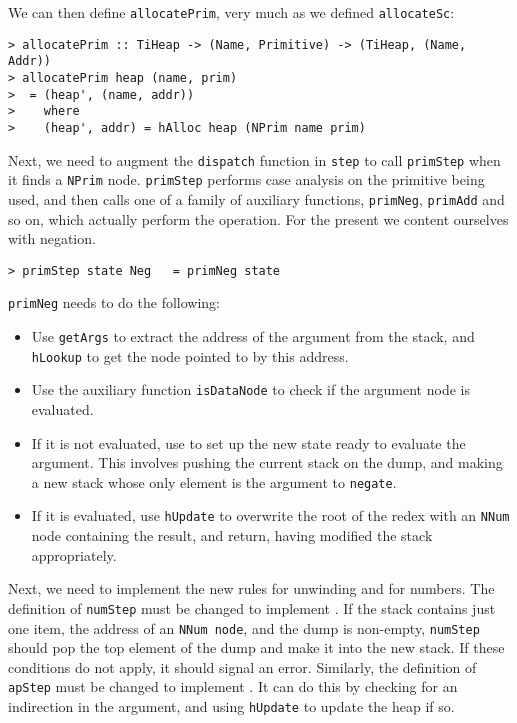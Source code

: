 We can then define \mbox{\tt allocatePrim}, very much as we defined \mbox{\tt allocateSc}:
\begin{verbatim}
> allocatePrim :: TiHeap -> (Name, Primitive) -> (TiHeap, (Name, Addr))
> allocatePrim heap (name, prim)
>  = (heap', (name, addr))
>    where
>    (heap', addr) = hAlloc heap (NPrim name prim)
\end{verbatim}
%
%
\par
Next, we need to augment the \mbox{\tt dispatch} function in \mbox{\tt step} to
call \mbox{\tt primStep} when it finds a \mbox{\tt NPrim} node.
\mbox{\tt primStep} performs case analysis on the primitive being used,
and then calls one of a family of
auxiliary functions, \mbox{\tt primNeg}, \mbox{\tt primAdd} and so on, which actually
perform the operation.  For the present we content ourselves with
negation.
\begin{verbatim}
> primStep state Neg   = primNeg state
\end{verbatim}
%
\mbox{\tt primNeg} needs to do the following:
\begin{itemize}
\item
Use \mbox{\tt getArgs} to extract
the address of the argument from the stack, and \mbox{\tt hLookup} to get the node
pointed to by this address.
\item
Use the auxiliary function \mbox{\tt isDataNode} to
check if the argument node is evaluated.

\item
If it is not evaluated, use  to set up the new
state ready to evaluate the argument.
This involves pushing the current stack on the dump, and making a new stack
whose only element is the argument to \mbox{\tt negate}.

\item
If it is evaluated, use \mbox{\tt hUpdate} to overwrite
the root of the redex with an \mbox{\tt NNum} node
containing the result, and return, having modified the stack appropriately.
\end{itemize}

Next, we need to implement the new rules for unwinding and
for numbers.
The definition of \mbox{\tt numStep} must be changed
to implement .
If the stack contains
just one item, the address of an \mbox{\tt NNum\ node}, and the dump is non-empty,
\mbox{\tt numStep} should pop the top element of the dump and make it into the new stack.
If these conditions do not apply, it should signal an error.
Similarly, the definition of \mbox{\tt apStep} must be changed to implement
.
It can do this by checking for an indirection
in the argument, and using
\mbox{\tt hUpdate} to update the heap if so.

